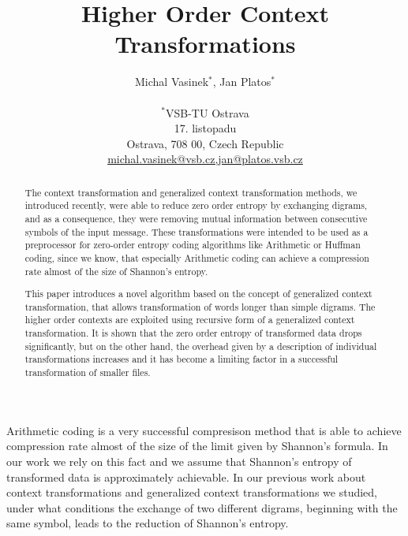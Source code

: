 \documentclass[smallabstract,smallcaptions]{dccpaper}
\begin{document}
\title
{\large
\textbf{Higher Order Context Transformations}
}


\author{%
Michal Vasinek$^{\ast}$, Jan Platos$^{\ast}$\\[0.5em]
{\small\begin{minipage}{\linewidth}\begin{center}
\begin{tabular}{c}
$^{\ast}$VSB-TU Ostrava \\
17. listopadu \\
Ostrava, 708 00, Czech Republic \\
\url{michal.vasinek@vsb.cz,jan@platos.vsb.cz} \\[0.5em]
\end{tabular}
\end{center}\end{minipage}}
}


\maketitle
\thispagestyle{empty}


\begin{abstract}
The context transformation and generalized context transformation methods, we introduced recently, were able to reduce zero order entropy by exchanging digrams, and as a consequence, they were removing mutual information between consecutive symbols of the input message. 
These transformations were intended to be used as a preprocessor for zero-order entropy coding algorithms like Arithmetic or Huffman coding, since we know, that especially Arithmetic coding can achieve a compression rate almost
of the size of Shannon's entropy.

This paper introduces a novel algorithm based on the concept of generalized context transformation, that allows transformation of words longer than simple digrams. The higher order contexts are exploited using recursive form of a generalized context transformation.
It is shown that the zero order entropy of transformed data drops significantly, but on the other hand, the overhead given by a description of individual transformations increases and it has become a limiting factor in a successful transformation of smaller files.
\end{abstract}


Arithmetic coding\cite{wit87} is a very successful compresison method that is able to achieve compression rate almost of the size of the limit given by Shannon's formula. In our work we rely on this fact and we assume that Shannon's entropy of transformed data is approximately achievable.
In our previous work about context transformations \cite{vasinek14} and generalized context transformations \cite{vasinek15} we studied, under what conditions the exchange of two different digrams, beginning with the same symbol, leads to the reduction of Shannon's entropy.
\end{document}
